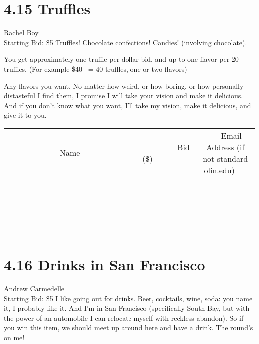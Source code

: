 \documentclass[11pt]{article}
\begin{document}
\section*{4.15 Truffles}
Rachel Boy
\\
Starting Bid: \$5
\newline
Truffles! Chocolate confections! Candies! (involving chocolate). 

You get approximately one truffle per dollar bid, and up to one flavor per 20 truffles. (For example \$40 ~= 40 truffles, one or two flavors) 

Any flavors you want. No matter how weird, or how boring, or how personally distasteful I find them, I promise I will take your vision and make it delicious. And if you don't know what you want, I'll take my vision, make it delicious, and give it to you.
\\[3ex]
\begin{tabular}{c c c}
~~~~~~~~~~~~~Name~~~~~~~~~~~~~ & ~~~~~~~~~Bid (\$)~~~~~~~~~  & ~~~Email Address (if not standard olin.edu)~~~\\
 & & \\
\hline
 & & \\
\hline
 & & \\
\hline
 & & \\
\hline
 & & \\
\hline
 & & \\
\hline
 & & \\
\hline
 & & \\
\hline
 & & \\
\hline
 & & \\
\hline
 & & \\
\hline
 & & \\
\hline
 & & \\
\hline
 & & \\
\hline
 & & \\
\hline
 & & \\
\hline
 & & \\
\hline
 & & \\
\hline
 & & \\
\hline
\end{tabular}
\newpage
\section*{4.16 Drinks in San Francisco}
Andrew Carmedelle
\\
Starting Bid: \$5
\newline
I like going out for drinks. Beer, cocktails, wine, soda: you name it, I probably like it. And I'm in San Francisco (specifically South Bay, but with the power of an automobile I can relocate myself with reckless abandon). So if you win this item, we should meet up around here and have a drink. The round's on me! 
\end{document}

